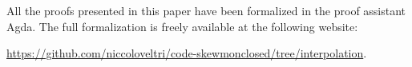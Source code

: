 \documentclass[sn-mathphys-num]{sn-jnl}%
\newcommand{\GG}{\Gamma}
\newcommand{\GT}{\Theta}
\newcommand{\vd}{\vdash}
\newcommand{\SkNMILL}{$\mathtt{SkNMILL}$}
\newcommand{\LSkT}{$\mathtt{LSkT}$}
\theoremstyle{thmstyleone}%
\theoremstyle{thmstyletwo}%
\theoremstyle{thmstylethree}%
\begin{document}



All the proofs presented in this paper have been formalized in the proof assistant Agda. The full formalization is freely available at the following website:
\begin{center}
  \url{https://github.com/niccoloveltri/code-skewmonclosed/tree/interpolation}.
\end{center}


\end{document}
